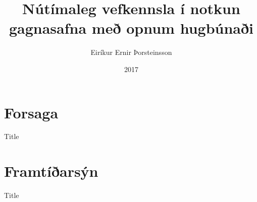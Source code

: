 \documentclass[hi-blar]{beamer}
\title{Nútímaleg vefkennsla í notkun gagnasafna með opnum hugbúnaði}
\author{Eiríkur Ernir Þorsteinsson}
\institute{Háskóli Íslands}
\date{2017}
\begin{document}
{
  \frame{\titlepage}
}


\frame{\tableofcontents}

\section{Forsaga}

\begin{frame}{Title}
  
\end{frame}

\section{Framtíðarsýn}

\begin{frame}{Title}
  
\end{frame}
\end{document}
